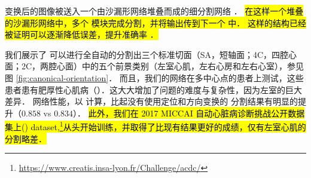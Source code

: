 变换后的图像被送入一个由沙漏形网络堆叠而成的细分割网络 \citep{Newell2016}．
\hl{
在这样一个堆叠的沙漏形网络中，多个 \UNet{} 模块完成分割，并将输出传到下一个 \UNet{} 中．
这样的结构已经被证明可以逐渐降低误差，提升准确率 \citep{Newell2016}．
}

我们展示了 \omeganet{} 可以进行全自动的分割出三个标准切面（SA，短轴面；4C，四腔心面；2C，两腔心面）中的五个前景类别（左室心肌，左右心房和左右心室），参见图 \ref{fig:canonical-orientation}．
而且，我们的网络在多中心点的患者上测试，这些患者患有肥厚性心肌病（\HCM{}）．这大大增加了问题的难度与复杂性，因为左室的巨大差异．
网络性能，以 \IoU{} 计算，比起没有使用定位和方向变换的 \UNet{} 分割结果有明显的提升（$0.858$ vs $0.834$）．
\hl{
此外，我们在 2017 MICCAI 自动心脏病诊断挑战公开数据集上(\miccaidata{}) dataset,\footnote{\url{https://www.creatis.insa-lyon.fr/Challenge/acdc/}}从头开始训练，并取得了比现有结果\citep{Isensee2018}更好的成绩，仅有左室心肌的分割略差．
}
